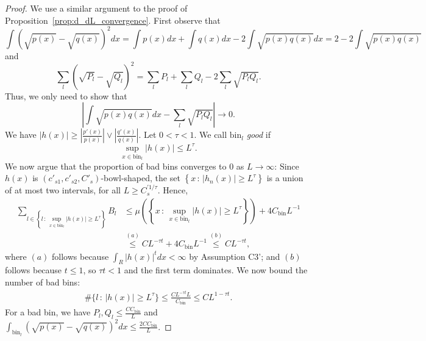 \documentclass{article}
\newcommand{\bin}{\text{bin}}
\begin{document}
\begin{proof}
We use a similar argument to the proof of Proposition~\ref{prop:d_dL_convergence}. First observe that
\begin{equation*}
\int (\sqrt{p(x)} - \sqrt{q(x)})^2 dx = \int p(x) dx + \int q(x) dx - 2 \int \sqrt{p(x)q(x)} dx = 2 - 2 \int \sqrt{p(x)q(x)}
\end{equation*}
and
\begin{equation*}
\sum_l (\sqrt{P_l} - \sqrt{Q_l})^2 = \sum_l P_l + \sum_l Q_l - 2 \sum_l \sqrt{P_l Q_l}.
\end{equation*}
Thus, we only need to show that 
\[
\left| \int \sqrt{p(x)q(x)} dx - \sum_l \sqrt{P_l Q_l} \right| \rightarrow 0.
\]
We have $|h(x)| \geq \left| \frac{p'(x)}{p(x)} \right| \vee \left| \frac{q'(x)}{q(x)} \right|$. Let $0 < \tau < 1$. We call $\bin_l$ \emph{good} if
$$
\sup_{x \in \bin_l} |h(x)| \leq L^\tau.
$$
We now argue that the proportion of bad bins converges to 0 as $L \rightarrow \infty$: Since $h(x)$ is $(c'_{s1}, c'_{s2}, C'_s)$-bowl-shaped, the set $\left \{x \,:\, |h_n(x)|  \geq L^\tau \right \}$ is a union of at most two intervals, for all $L \geq C_s^{\prime 1/\tau}$. Hence,
\begin{align*}
\sum_{l \in \left \{ l \,:\, \sup_{x \in \bin_l} |h(x)| 
           \geq L^\tau \right \}}  B_l &\leq 
   \mu \left( \left\{x \,:\, \sup_{x \in \bin_l} |h(x)|
         \geq L^\tau \right\} \right) + 4 C_\bin L^{-1} \\
  &\stackrel{(a)} \leq C L^{-\tau t}  + 4 C_\bin L^{-1} \stackrel{(b)}{\leq} C L^{ - \tau t},
\end{align*}
where $(a)$ follows because $\int_R |h(x)|^t dx < \infty$ by Assumption C3'; and $(b)$ follows because $t \leq 1$, so $\tau t < 1$ and the first term dominates. We now bound the number of bad bins: 
\begin{align*}
\# \{ l \,:\, |h(x)| \geq L^\tau \} \leq \frac{C L^{- \tau t} L}{C_\bin}  \leq C L^{1 - \tau t}.
\end{align*}
For a bad bin, we have $P_l, Q_l \leq \frac{C C_\bin}{L}$ and $\int_{\bin_l} (\sqrt{p(x)} - \sqrt{q(x)})^2 dx \leq \frac{2CC_\bin}{L}$.


\end{proof}
\end{document}
